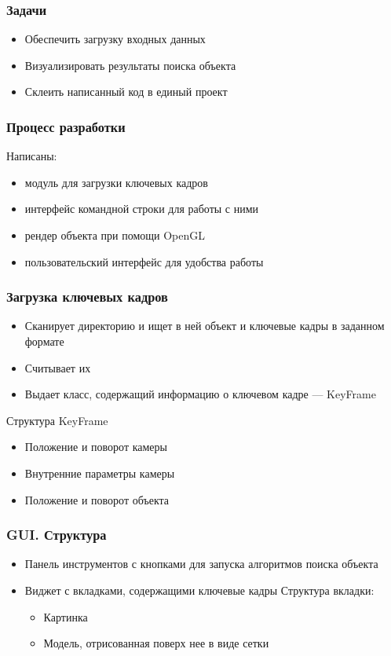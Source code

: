 \begin{frame}\frametitle{Задачи}
    \begin{itemize}
        \item Обеспечить загрузку входных данных
        \item Визуализировать результаты поиска объекта
        \item Склеить написанный код в единый проект
    \end{itemize}
\end{frame}

\begin{frame}\frametitle{Процесс разработки}
    Написаны:
    \begin{itemize}
        \item модуль для загрузки ключевых кадров
        \item интерфейс командной строки для работы с ними
        \item рендер объекта при помощи OpenGL
        \item пользовательский интерфейс для удобства работы
    \end{itemize}
\end{frame}

\begin{frame}\frametitle{Загрузка ключевых кадров}
    \begin{itemize}
        \item Сканирует директорию и ищет в ней объект и ключевые кадры в 
            заданном формате
        \item Считывает их
        \item Выдает класс, содержащий информацию о ключевом кадре --- KeyFrame
    \end{itemize}
    Структура KeyFrame
    \begin{itemize}
        \item Положение и поворот камеры
        \item Внутренние параметры камеры
        \item Положение и поворот объекта
    \end{itemize}
\end{frame}

\begin{frame}\frametitle{GUI. Структура}
    \begin{itemize}
        \item Панель инструментов с кнопками для запуска алгоритмов поиска 
            объекта
        \item Виджет с вкладками, содержащими ключевые кадры
            Структура вкладки:
            \begin{itemize}
                \item Картинка
                \item Модель, отрисованная поверх нее в виде сетки
            \end{itemize}
    \end{itemize}
\end{frame}

